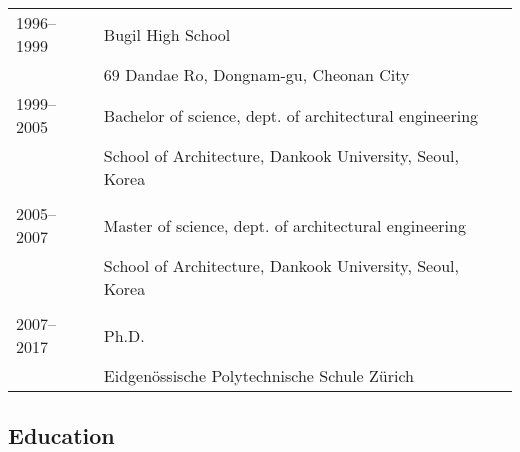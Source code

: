 \begin{tabular}{p{}l}
    1996--1999 & Bugil High School  \\
    & 69 Dandae Ro, Dongnam-gu, Cheonan City\\
    1999--2005 & Bachelor of science, dept. of architectural engineering\\
    & School of Architecture, Dankook University, Seoul, Korea \\
    \\
    2005--2007 & Master of science, dept. of architectural engineering\\
    & School of Architecture, Dankook University, Seoul, Korea \\
    \\
    2007--2017 & Ph.D. \\
    & Eidgen\"ossische Polytechnische Schule Z\"urich \\
\end{tabular}

\subsection*{Education}

